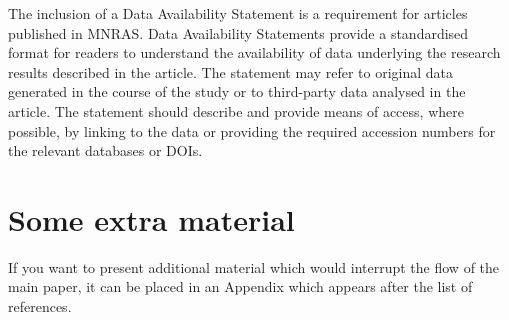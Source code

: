 \documentclass[fleqn,usenatbib]{mnras}
\begin{document}
 
The inclusion of a Data Availability Statement is a requirement for articles published in MNRAS. Data Availability Statements provide a standardised format for readers to understand the availability of data underlying the research results described in the article. The statement may refer to original data generated in the course of the study or to third-party data analysed in the article. The statement should describe and provide means of access, where possible, by linking to the data or providing the required accession numbers for the relevant databases or DOIs.












\appendix

\section{Some extra material}

If you want to present additional material which would interrupt the flow of the main paper,
it can be placed in an Appendix which appears after the list of references.



\bsp	%
\label{lastpage}
\end{document}
